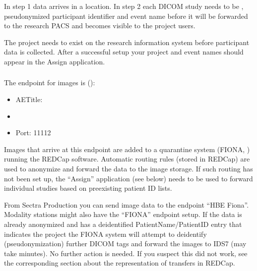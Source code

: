 \documentclass[letterpaper,10pt,english]{sphinxmanual}
\begin{document}
\sphinxAtStartPar
In step 1 data arrives in a  location. In step 2 each DICOM study needs to be , pseudonymized participant identifier and event name before it will be forwarded to the research PACS and becomes visible to the project users.

\begin{figure}[htbp]
\centering

\noindent{}
\end{figure}



\sphinxAtStartPar
{}

\sphinxAtStartPar
The project needs to exist on the research information system before participant data is collected. After a successful setup your project and event names should appear in the Assign application.


\subsubsection{}
\label{\detokenize{EndUser/index:how-to-add-image-data}}
\sphinxAtStartPar
The end\sphinxhyphen{}point for images is  ():
\begin{itemize}
\item {} 
\sphinxAtStartPar
AETitle: 

\item {} 
\sphinxAtStartPar
{}

\item {} 
\sphinxAtStartPar
Port: 11112

\end{itemize}

\sphinxAtStartPar
Images that arrive at this endpoint are added to a quarantine system (FIONA, ) running the REDCap software. Automatic routing rules (stored in REDCap) are used to anonymize and forward the data to the image storage. If such routing has not been set up, the “Assign” application (see below) needs to be used to forward individual studies based on pre\sphinxhyphen{}existing patient ID lists.

\sphinxAtStartPar
From Sectra Production you can send image data to the endpoint “HBE Fiona”. Modality stations might also have the “FIONA” endpoint setup. If the data is already anonymized and has a de\sphinxhyphen{}identified PatientName/PatientID entry that indicates the project the FIONA system will attempt to de\sphinxhyphen{}identify (pseudonymization) further DICOM tags and forward the images to IDS7 (may take minutes). No further action is needed. If you suspect this did not work, see the corresponding section about the representation of transfers in REDCap.
\end{document}
